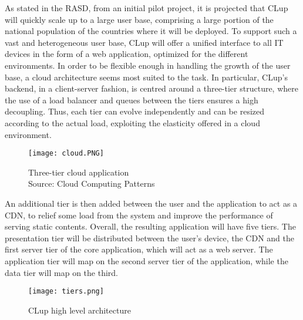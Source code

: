 \documentclass[../../main.tex]{subfiles}
\begin{document}
As stated in the RASD, from an initial pilot project, it is projected that CLup will quickly scale up to a large user base, 
comprising a large portion of the national population of the countries where it will be deployed. 
To support such a vast and heterogeneous user base, 
CLup will offer a unified interface to all IT devices in the form of a web application, optimized for the different environments.
In order to be flexible enough in handling the growth of the user base, a cloud architecture seems most suited to the task. 
In particular, CLup's backend, in a client-server fashion, is centred around a three-tier structure, where the use of a load balancer 
and queues between the tiers ensures a high decoupling. 
Thus, each tier can evolve independently and can be resized according to the actual load, 
exploiting the elasticity offered in a cloud environment.

\begin{figure}[H]
    \centering
    \texttt{[image: cloud.PNG]}
    \caption{
        Three-tier cloud application\\
        Source: Cloud Computing Patterns
    }
\end{figure}

An additional tier is then added between the user and the application to act as a CDN, to relief some load from the system and improve the performance of serving static contents. Overall,
 the resulting application will have five tiers.
The presentation tier will be distributed between the user's device, the CDN and the first  server tier of the core application, which will act as a web server. The application tier will map on the second server tier of the application, while the data tier will map on the third.


\begin{figure}[H]
    \centering
    \texttt{[image: tiers.png]}
    \caption{
        CLup high level architecture
    }
\end{figure}
\end{document}
